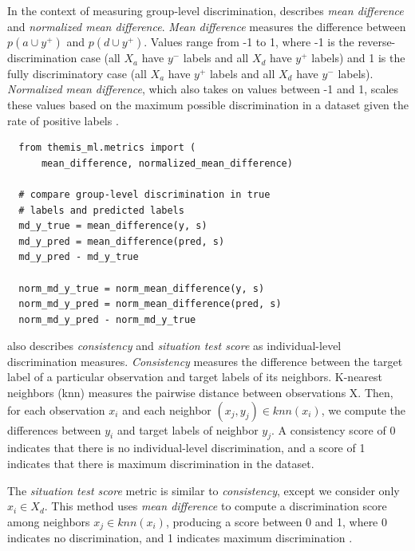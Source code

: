 \documentclass{{interact/interact}}
\begin{document}
In the context of measuring group-level discrimination,
\cite{zliobaite2015survey} describes \emph{mean difference} and \emph{normalized
mean difference}. \emph{Mean difference} measures the difference between \(p(a
\cup y^{+})\) and \(p(d \cup y^{+})\). Values range from -1 to 1, where -1 is
the reverse-discrimination case (all \(X_a\) have \(y^{-}\) labels and all
\(X_d\) have \(y^{+}\) labels) and 1 is the fully discriminatory case
(all \(X_a\) have \(y^{+}\) labels and all \(X_d\) have \(y^{-}\) labels).
\emph{Normalized mean difference}, which also takes on values between -1 and 1,
scales these values based on the maximum possible discrimination in a dataset
given the rate of positive labels \cite{zliobaite2015survey}.

\begin{verbatim}
  from themis_ml.metrics import (
      mean_difference, normalized_mean_difference)

  # compare group-level discrimination in true
  # labels and predicted labels
  md_y_true = mean_difference(y, s)
  md_y_pred = mean_difference(pred, s)
  md_y_pred - md_y_true

  norm_md_y_true = norm_mean_difference(y, s)
  norm_md_y_pred = norm_mean_difference(pred, s)
  norm_md_y_pred - norm_md_y_true
\end{verbatim}

\cite{zliobaite2015survey} also describes \emph{consistency} and \emph{situation
test score} as individual-level discrimination measures. \emph{Consistency}
measures the difference between the target label of a particular observation and
target labels of its neighbors. K-nearest neighbors (knn) measures the pairwise
distance between observations X. Then, for each observation \(x_i\) and each
neighbor \((x_j, y_j) \in knn(x_i)\), we compute the differences between \(y_i\)
and target labels of neighbor \(y_j\). A consistency score of 0 indicates that
there is no individual-level discrimination, and a score of 1 indicates that
there is maximum discrimination in the dataset.

The \emph{situation test score} metric is similar to \emph{consistency}, except
we consider only \(x_i \in X_d\). This method uses \emph{mean difference} to
compute a discrimination score among neighbors \(x_j \in knn(x_i)\), producing a
score between 0 and 1, where 0 indicates no discrimination, and 1 indicates
maximum discrimination \cite{zliobaite2015survey}.
\end{document}
